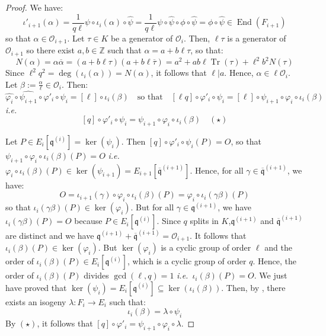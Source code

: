 \documentclass[a4paper,10pt]{report}
\theoremstyle{definition}
\theoremstyle{plain}
\theoremstyle{definition}
\newcommand{\ie}{\emph{i.e.}\ }
\newcommand{\Z}{\mathbb{Z}}
\newcommand{\mO}{\mathcal{O}}
\renewcommand{\(}{\left(}
\renewcommand{\)}{\right)}
\newcommand{\mfq}{\mathfrak{q}}
\DeclareMathOperator{\End}{End}
\DeclareMathOperator{\Tr}{Tr}
\begin{document}
\begin{proof}
We have:
\[\iota'_{i+1}(\alpha)=\frac{1}{q\ell}\psi\circ\iota_i(\alpha)\circ\widehat{\psi}=\frac{1}{q\ell}\psi\circ \widehat{\psi}\circ\phi\circ\widehat{\psi}=\phi\circ\widehat{\psi}\in \End(F_{i+1})\]
so that $\alpha\in \mO_{i+1}$. Let $\tau\in K$ be a generator of $\mO_i$. Then, $\ell\tau$ is a generator of $\mO_{i+1}$ so there exist $a,b\in\Z$ such that $\alpha=a+b\ell\tau$, so that:
\[N(\alpha)=\alpha\overline{\alpha}=(a+b\ell\tau)(a+b\ell\overline{\tau})=a^2+ab\ell\Tr(\tau)+\ell^2b^2N(\tau)\]
Since $\ell^2q^2=\deg(\iota_i(\alpha))=N(\alpha)$, it follows that $\ell|a$. Hence, $\alpha\in\ell\mO_i$.  Let $\beta:=\frac{\alpha}{\ell}\in\mO_i$.  Then:
\[\widehat{\varphi_i}\circ\widehat{\psi_{i+1}}\circ\varphi'_i\circ\psi_i=[\ell]\circ\iota_i(\beta)\quad\mbox{so that} \quad [\ell q]\circ\varphi'_i\circ\psi_i=[\ell]\circ\psi_{i+1}\circ\varphi_i\circ\iota_i(\beta)\]
\ie
\[[q]\circ\varphi'_i\circ\psi_i=\psi_{i+1}\circ\varphi_i\circ\iota_i(\beta)\quad (\star)\]

Let $P\in E_i[\mfq^{(i)}]=\ker(\psi_i)$.  Then $[q]\circ\varphi'_i\circ\psi_i(P)=O$, so that $\psi_{i+1}\circ\varphi_i\circ\iota_i(\beta)(P)=O$ \ie $\varphi_i\circ\iota_i(\beta)(P)\in\ker(\psi_{i+1})=E_{i+1}[\overline{\mfq}^{(i+1)}]$. Hence, for all $\gamma\in\overline{\mfq}^{(i+1)}$, we have:
\[O=\iota_{i+1}(\gamma)\circ\varphi_i\circ\iota_i(\beta)(P)=\varphi_i\circ\iota_i(\gamma\beta)(P) \]
so that $\iota_i(\gamma\beta)(P)\in\ker(\varphi_i)$. But for all $\gamma\in\mfq^{(i+1)}$, we have $\iota_i(\gamma\beta)(P)=O$ because $P\in E_i[\mfq^{(i)}]$.  Since $q$ splits in $K$,$\mfq^{(i+1)}$ and $\overline{\mfq}^{(i+1)}$ are distinct and we have $\mfq^{(i+1)}+\overline{\mfq}^{(i+1)}=\mO_{i+1}$. It follows that $\iota_i(\beta)(P)\in\ker(\varphi_i)$. But $\ker(\varphi_i)$ is a cyclic group of order $\ell$ and the order of $\iota_i(\beta)(P)\in E_i[\mfq^{(i)}]$, which is a cyclic group of order $q$. Hence, the order of $\iota_i(\beta)(P)$ divides $\gcd(\ell,q)=1$ \ie $\iota_i(\beta)(P)=O$.  We just have proved that $\ker(\psi_i)=E_i[\mfq^{(i)}]\subseteq\ker(\iota_i(\beta))$. Then, by \cite[corollary III.4.11]{Silverman1}, there exists an isogeny $\lambda : F_i\longrightarrow E_i$ such that: 
\[\iota_i(\beta)=\lambda\circ\psi_i\]
By $(\star)$,  it follows that $[q]\circ\varphi'_i=\psi_{i+1}\circ\varphi_i\circ\lambda$. 


\end{proof}
\end{document}
